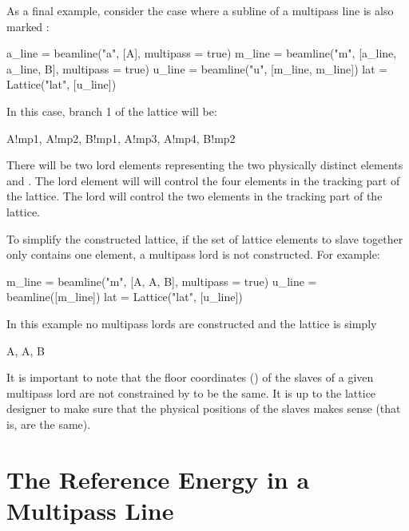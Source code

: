 As a final example, consider the case where a subline of a multipass line is also marked
:
\begin{example}
  a_line = beamline("a", [A], multipass = true)
  m_line = beamline("m", [a_line, a_line, B], multipass = true)
  u_line = beamline("u", [m_line, m_line])
  lat = Lattice("lat", [u_line])
\end{example}
In this case, branch 1 of the lattice will be:
\begin{example}
  A!mp1, A!mp2, B!mp1, A!mp3, A!mp4, B!mp2
\end{example}
There will be two lord elements representing the two physically distinct elements  and .
The  lord element will will control the four  elements in the tracking
part of the lattice. The  lord will control the two  elements in the tracking part
of the lattice. 

To simplify the constructed lattice, if the set of lattice elements to slave together only contains
one element, a multipass lord is not constructed. For example:
\begin{example}
  m_line = beamline("m", [A, A, B], multipass = true)
  u_line = beamline([m_line])
  lat = Lattice("lat", [u_line])
\end{example}
In this example no multipass lords are constructed and the lattice is simply
\begin{example}
  A, A, B
\end{example}

It is important to note that the floor coordinates () of the slaves of a given
multipass lord are not constrained by \accellat to be the same. It is up to the lattice designer to make
sure that the physical positions of the slaves makes sense (that is, are the same).

\section{The Reference Energy in a Multipass Line}
\label{s:ref.e.multi}

